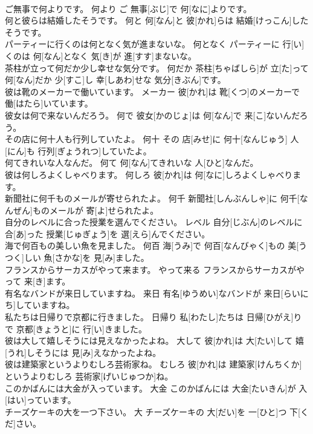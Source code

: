 \documentclass[8pt]{extreport}
\begin{document}
\begin{CJK}{UTF8}{min}
\\	ご無事で何よりです。	何より	ご 無事[ぶじ]で 何[なに]よりです。	
\\	何と彼らは結婚したそうです。	何と	何[なん]と 彼[かれ]らは 結婚[けっこん]したそうです。	
\\	パーティーに行くのは何となく気が進まないな。	何となく	パーティーに 行[い]くのは 何[なん]となく 気[き]が 進[すす]まないな。	
\\	茶柱が立って何だか少し幸せな気分です。	何だか	茶柱[ちゃばしら]が 立[た]って 何[なん]だか 少[すこ]し 幸[しあわ]せな 気分[きぶん]です。	
\\	彼は靴のメーカーで働いています。	メーカー	彼[かれ]は 靴[くつ]のメーカーで 働[はたら]いています。	
\\	彼女は何で来ないんだろう。	何で	彼女[かのじょ]は 何[なん]で 来[こ]ないんだろう。	
\\	その店に何十人も行列していたよ。	何十	その 店[みせ]に 何十[なんじゅう] 人[にん]も 行列[ぎょうれつ]していたよ。	
\\	何てきれいな人なんだ。	何て	何[なん]てきれいな 人[ひと]なんだ。	
\\	彼は何しろよくしゃべります。	何しろ	彼[かれ]は 何[なに]しろよくしゃべります。	
\\	新聞社に何千ものメールが寄せられたよ。	何千	新聞社[しんぶんしゃ]に 何千[なんぜん]ものメールが 寄[よ]せられたよ。	
\\	自分のレベルに合った授業を選んでください。	レベル	自分[じぶん]のレベルに 合[あ]った 授業[じゅぎょう]を 選[えら]んでください。	
\\	海で何百もの美しい魚を見ました。	何百	海[うみ]で 何百[なんびゃく]もの 美[うつく]しい 魚[さかな]を 見[み]ました。	
\\	フランスからサーカスがやって来ます。	やって来る	フランスからサーカスがやって 来[き]ます。	
\\	有名なバンドが来日していますね。	来日	有名[ゆうめい]なバンドが 来日[らいにち]していますね。	
\\	私たちは日帰りで京都に行きました。	日帰り	私[わたし]たちは 日帰[ひがえ]りで 京都[きょうと]に 行[い]きました。	
\\	彼は大して嬉しそうには見えなかったよね。	大して	彼[かれ]は 大[たい]して 嬉[うれ]しそうには 見[み]えなかったよね。	
\\	彼は建築家というよりむしろ芸術家ね。	むしろ	彼[かれ]は 建築家[けんちくか]というよりむしろ 芸術家[げいじゅつか]ね。	
\\	このかばんには大金が入っています。	大金	このかばんには 大金[たいきん]が 入[はい]っています。	
\\	チーズケーキの大を一つ下さい。	大	チーズケーキの 大[だい]を 一[ひと]つ 下[くだ]さい。	

\end{CJK}
\end{document}
